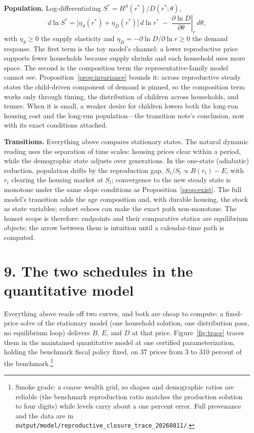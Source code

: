 \documentclass[11pt]{article}
\theoremstyle{definition}
\begin{document}
\textbf{Population.} Log-differentiating $S^{*}=H^S(r^{*})/D(r^{*};\theta)$,
\begin{equation}
d\ln S^{*}
=\bigl[\eta_S(r^{*})+\eta_D(r^{*})\bigr]\,d\ln r^{*}
\;-\;\left.\frac{\partial\ln D}{\partial\theta}\right|_{r}\,d\theta ,
\label{eq:dS}
\end{equation}
with $\eta_S\ge0$ the supply elasticity and $\eta_D=-\partial\ln D/\partial\ln
r\ge0$ the demand response. The first term is the toy model's channel: a lower
reproductive price supports fewer households because supply shrinks and each
household uses more space. The second is the composition term the
representative-family model cannot see. Proposition~\ref{prop:invariance}
bounds it: across reproductive steady states the child-driven component of
demand is pinned, so the composition term works only through timing, the
distribution of children across households, and tenure. When it is small, a
weaker desire for children lowers both the long-run housing cost and the
long-run population---the transition note's conclusion, now with its exact
conditions attached.

\textbf{Transitions.} Everything above compares stationary states. The natural
dynamic reading uses the separation of time scales: housing prices clear
within a period, while the demographic state adjusts over generations. In the
one-state (adiabatic) reduction, population drifts by the reproduction gap,
$\dot S_t/S_t\propto B(r_t)-E$, with $r_t$ clearing the housing market at
$S_t$; convergence to the new steady state is monotone under the same slope
conditions as Proposition~\ref{prop:exist}. The full model's transition adds
the age composition and, with durable housing, the stock as state variables;
cohort echoes can make the exact path non-monotone. The honest scope is
therefore: endpoints and their comparative statics are equilibrium objects;
the arrow between them is intuition until a calendar-time path is computed.

\section*{9. The two schedules in the quantitative model}

Everything above reads off two curves, and both are cheap to compute: a
fixed-price solve of the stationary model (one household solution, one
distribution pass, no equilibrium loop) delivers $B$, $E$, and $D$ at that
price. Figure~\ref{fig:trace} traces them in the maintained quantitative
model at one certified parameterization, holding the benchmark fiscal policy
fixed, on 37 prices from 3 to 310 percent of the benchmark.\footnote{Smoke
grade: a coarse wealth grid, so shapes and demographic ratios are reliable
(the benchmark reproduction ratio matches the production solution to four
digits) while levels carry about a one percent error. Full provenance and the
data are in \texttt{output/model/reproductive\_closure\_trace\_20260811/}.}
\end{document}
